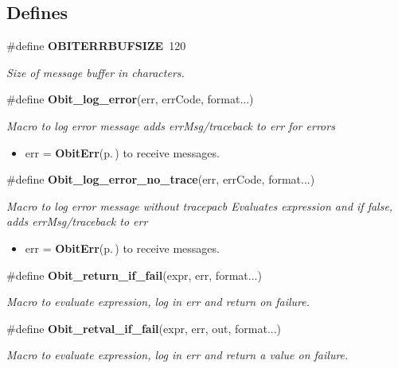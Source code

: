 \subsection*{Defines}
\begin{CompactItemize}
\item 
\#define {\bf OBITERRBUFSIZE}\ 120
\begin{CompactList}\small\item\em Size of message buffer in characters. \item\end{CompactList}\item 
\#define {\bf Obit\_\-log\_\-error}(err, err\-Code, format...)
\begin{CompactList}\small\item\em Macro to log error message adds err\-Msg/traceback to err for errors \begin{itemize}
\item err = {\bf Obit\-Err}{\rm (p.\,\pageref{structObitErr})} to receive messages. \end{itemize}
\item\end{CompactList}\item 
\#define {\bf Obit\_\-log\_\-error\_\-no\_\-trace}(err, err\-Code, format...)
\begin{CompactList}\small\item\em Macro to log error message without tracepacb Evaluates expression and if false, adds err\-Msg/traceback to err \begin{itemize}
\item err = {\bf Obit\-Err}{\rm (p.\,\pageref{structObitErr})} to receive messages. \end{itemize}
\item\end{CompactList}\item 
\#define {\bf Obit\_\-return\_\-if\_\-fail}(expr, err, format...)
\begin{CompactList}\small\item\em Macro to evaluate expression, log in err and return on failure. \item\end{CompactList}\item 
\#define {\bf Obit\_\-retval\_\-if\_\-fail}(expr, err, out, format...)
\begin{CompactList}\small\item\em Macro to evaluate expression, log in err and return a value on failure. \item\end{CompactList}\item 

\end{CompactItemize}

